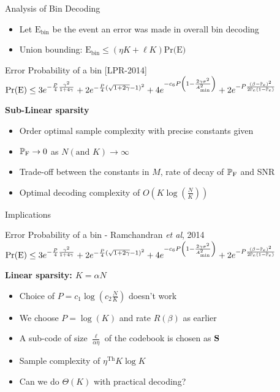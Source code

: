 \documentclass[10pt]{beamer}
\begin{document}
\begin{frame}{Analysis of Bin Decoding}
\begin{itemize}
\item Let $\text{E}_{\text{bin}}$ be the event an error was made in overall bin decoding
\item Union bounding: $\text{E}_{\text{bin}}\leq (\eta K+\ell K)\text{Pr(E)}$
\end{itemize}
\begin{block}{Error Probability of a bin [LPR-2014]}
$\text{Pr(E)}\leq 3e^{-\frac{P}{4}\frac{\gamma^2}{1+4 \gamma}}+2e^{-\frac{P}{4}(\sqrt{1+2\gamma}-1)^2}+4e^{-c_6 P\left(1-\frac{2\gamma\sigma^2}{A^{2}_{\text{min}}}\right)}+2e^{-P\frac{\left(\beta-\mathbb{P}_{e}\right)^2}{2\mathbb{P}_{e}(1-\mathbb{P}_{e})}}$
\end{block}
\vspace{2ex}
\begin{description}
    \item[\textbf{Sub-Linear sparsity}]
\end{description}
\begin{itemize}
\item Order optimal sample complexity with precise constants given
\item $\mathbb{P}_{\text{F}}\rightarrow 0$ as $N (\text{and } K)\rightarrow \infty$
\item Trade-off between the constants in $M$, rate of decay of  $\mathbb{P}_{\text{F}}$ and SNR
\item Optimal decoding complexity of $O\left(K\log\left(\frac{N}{K}\right)\right)$
\end{itemize}

\end{frame}

\begin{frame}{Implications}
\begin{block}{Error Probability of a bin - Ramchandran \textit{et al}, 2014}
$\text{Pr(E)}\leq 3e^{-\frac{P}{4}\frac{\gamma^2}{1+4 \gamma}}+2e^{-\frac{P}{4}(\sqrt{1+2\gamma}-1)^2}+4e^{-c_6 P\left(1-\frac{2\gamma\sigma^2}{A^{2}_{\text{min}}}\right)}+2e^{-P\frac{\left(\beta-\mathbb{P}_{e}\right)^2}{2\mathbb{P}_{e}(1-\mathbb{P}_{e})}}$
\end{block}

\vspace{2ex}
\begin{description}
    \item [\textbf{Linear sparsity: $K=\alpha N$}]
\end{description}
\begin{itemize}
\item Choice of $P=c_{1}\log\left(c_2 \frac{N}{K}\right)$ doesn't work
\item We choose $P=\log(K)$ and rate $R(\beta)$ as earlier
\item A sub-code of size $\frac{\ell}{\alpha\eta}$ of the codebook is chosen as $\mathbf{S}$
\item Sample complexity of $\eta^{\text{Th}}K\log K$
\item Can we do $\Theta(K)$ with practical decoding?
\end{itemize}

\end{frame}
\end{document}
